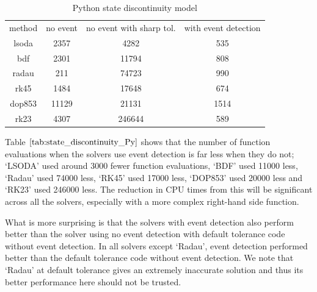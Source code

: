 \begin{table}[h]
\caption {Python state discontinuity model} \label{tab:state_discontinuity_Py}
\begin{center}
\begin{tabular}{ c c c c } 
method & no event & no event with sharp tol. & with event detection \\ 
lsoda & 2357 & 4282 & 535 \\
bdf & 2301 & 11794 & 808 \\
radau & 211 & 74723 & 990 \\
rk45 & 1484 & 17648 & 674 \\
dop853 & 11129 & 21131 & 1514 \\
rk23 & 4307 & 246644 & 589 \\
\end{tabular}
\end{center}
\end{table}

Table $\ref{tab:state_discontinuity_Py}$ shows that the number of function evaluations when the solvers use event detection is far less when they do not; `LSODA' used around 3000 fewer function evaluations, `BDF' used 11000 less, `Radau' used 74000 less, `RK45' used 17000 less, `DOP853' used 20000 less and `RK23' used 246000 less. The reduction in CPU times from this will be significant across all the solvers, especially with a more complex right-hand side function.

What is more surprising is that the solvers with event detection also perform better than the solver using no event detection with default tolerance code without event detection. In all solvers except `Radau', event detection performed better than the default tolerance code without event detection. We note that `Radau' at default tolerance gives an extremely inaccurate solution and thus its better performance here should not be trusted.

